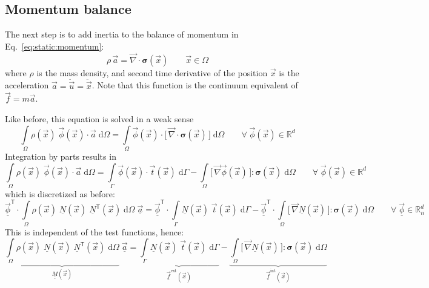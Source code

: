 \documentclass[times,namecite]{goose-article}
\begin{document}
\subsection{Momentum balance}

The next step is to add inertia to the balance of momentum in Eq.~\eqref{eq:static:momentum}:
\begin{equation}
  \rho\, \vec{a}
  =
  \vec{\nabla} \cdot
  \bm{\sigma}(\vec{x})
  \qquad
  \vec{x} \in \Omega
\end{equation}
where $\rho$ is the mass density, and second time derivative of the position $\vec{x}$ is the acceleration $\vec{a} = \ddot{\vec{u}} = \ddot{\vec{x}}$. Note that this function is the continuum equivalent of $\vec{f} = m \vec{a}$.

Like before, this equation is solved in a weak sense
\begin{equation}
  \int\limits_\Omega
    \rho(\vec{x})\; \vec{\phi}(\vec{x}) \cdot \vec{a} \;
  \mathrm{d}\Omega
  =
  \int\limits_\Omega
    \vec{\phi}(\vec{x})
    \cdot
    \Big[\,
      \vec{\nabla}
      \cdot
      \bm{\sigma}(\vec{x})
    \,\Big] \;
  \mathrm{d}\Omega
  \qquad
  \forall \; \vec{\phi}(\vec{x}) \in \mathbb{R}^d
\end{equation}
Integration by parts results in
\begin{equation}
  \int\limits_\Omega
    \rho(\vec{x})\; \vec{\phi}(\vec{x}) \cdot \vec{a} \;
  \mathrm{d}\Omega
  =
  \int\limits_\Gamma
    \vec{\phi}(\vec{x}) \cdot \vec{t}(\vec{x}) \;
  \mathrm{d}\Gamma
  -
  \int\limits_\Omega
    \big[\, \vec{\nabla} \vec{\phi}(\vec{x}) \,\big]
    :
    \bm{\sigma}(\vec{x}) \;
  \mathrm{d}\Omega
  \qquad
  \forall \; \vec{\phi}(\vec{x}) \in \mathbb{R}^d
\end{equation}
which is discretized as before:
\begin{equation}
  \underline{\vec{\phi}}^\mathsf{T} \cdot
  \int\limits_\Omega
    \rho(\vec{x})\; \underline{N}(\vec{x})\; \underline{N}^\mathsf{T}(\vec{x}) \;
  \mathrm{d}\Omega \;
  \underline{\vec{a}}
  =
  \underline{\vec{\phi}}^\mathsf{T} \cdot
  \int\limits_\Gamma
    \underline{N}(\vec{x})\; \vec{t}(\vec{x}) \;
  \mathrm{d}\Gamma
  -
  \underline{\vec{\phi}}^\mathsf{T} \cdot
  \int\limits_\Omega
    \big[\, \vec{\nabla} \underline{N}(\vec{x}) \,\big]
    :
    \bm{\sigma}(\vec{x}) \;
  \mathrm{d}\Omega
  \qquad
  \forall \; \underline{\vec{\phi}} \in \mathbb{R}^d_n
\end{equation}
This is independent of the test functions, hence:
\begin{equation}
\label{eq:dynamics:system}
  \underbrace{
    \int\limits_\Omega
      \rho(\vec{x})\; \underline{N}(\vec{x})\; \underline{N}^\mathsf{T}(\vec{x}) \;
    \mathrm{d}\Omega
  }_{\underline{\underline{M}}(\vec{x})} \;
  \underline{\vec{a}}
  =
  \underbrace{
    \int\limits_\Gamma
      \underline{N}(\vec{x})\; \vec{t}(\vec{x}) \;
    \mathrm{d}\Gamma
  }_{\underline{\vec{f}}^\mathrm{ext}(\vec{x})}
  -
  \underbrace{
    \int\limits_\Omega
      \big[\, \vec{\nabla} \underline{N}(\vec{x}) \,\big]
      :
      \bm{\sigma}(\vec{x}) \;
    \mathrm{d}\Omega
  }_{\underline{\vec{f}}^\mathrm{int}(\vec{x})}
\end{equation}
\end{document}
